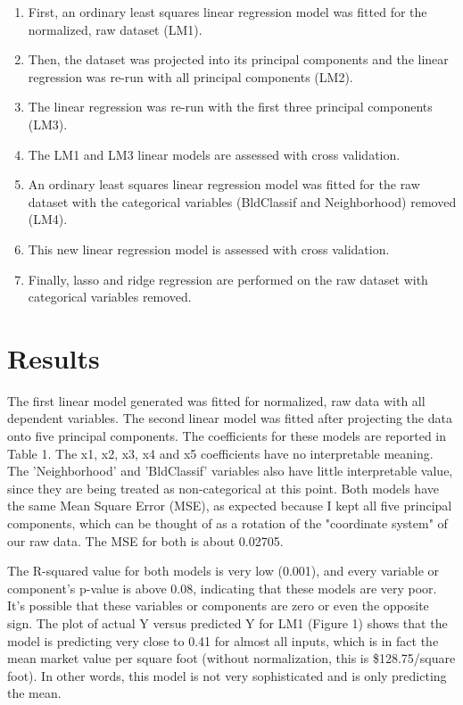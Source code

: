\documentclass[10pt,twocolumn]{article}
\begin{document}
\begin{enumerate}
\item First, an ordinary least squares linear regression model was fitted for
the normalized, raw dataset (LM1).
\item Then, the dataset was projected into its principal components and the linear
regression was re-run with all principal components (LM2).
\item The linear regression was re-run with the first three principal components (LM3).
\item The LM1 and LM3 linear models are assessed with cross validation.
\item An ordinary least squares linear regression model was fitted for the
raw dataset with the categorical variables (BldClassif and Neighborhood) removed (LM4).
\item This new linear regression model is assessed with cross validation.
\item Finally, lasso and ridge regression are performed on the raw dataset
with categorical variables removed.
\end{enumerate}


\section{Results}

The first linear model generated was fitted for normalized, raw data with all dependent
variables.  The second linear model was fitted after projecting the data onto
five principal components. The coefficients for these models are reported in
Table 1. The x1, x2, x3, x4 and x5 coefficients have no interpretable
meaning. The 'Neighborhood' and 'BldClassif' variables also have little
interpretable value, since they are being treated as non-categorical at this point.
Both models have the same Mean Square Error (MSE), as expected because I kept
all five principal components, which can be thought of as a rotation of
the "coordinate system" of our raw data. The MSE for both is about 0.02705.

The R-squared value for both models is very low (0.001), and every variable or component's
p-value is above 0.08, indicating that these models are very poor. It's possible that
these variables or components are zero or even the opposite sign. The plot of
actual Y versus predicted Y for LM1 (Figure 1) shows that the model is predicting
very close to 0.41 for almost all inputs, which is in fact the mean market value
per square foot (without normalization, this is \$128.75/square foot). In other words,
this model is not very sophisticated and is only predicting the mean.
\end{document}
